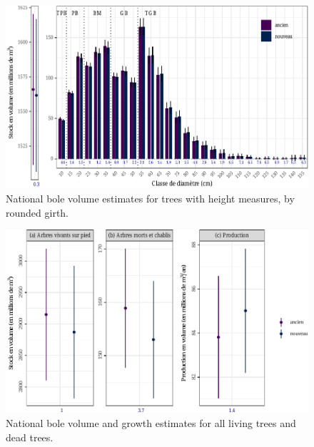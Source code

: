 \begin{figure}[h]
	\centering
	\includegraphics[scale = 0.6]{Figures/estimate_vbole_bygirth.pdf}
	\caption{National bole volume estimates for trees with height measures, by rounded girth. \label{fig::estimate_vbole_bygirth}}
\end{figure}

\begin{figure}[h]
	\centering
	\includegraphics[scale = 0.6]{Figures/estimate_vbole.pdf}
	\caption{National bole volume and growth estimates for all living trees and dead trees. \label{fig::estimate_vbole}}
\end{figure}
